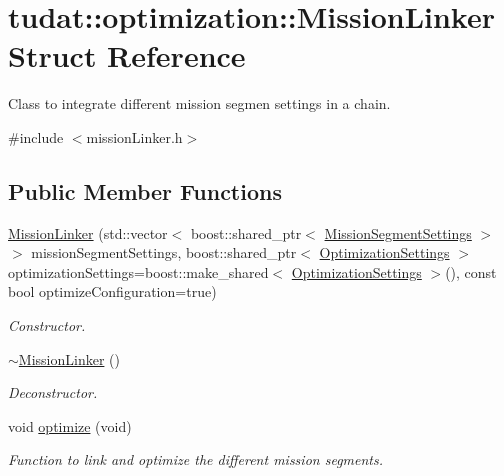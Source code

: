 \hypertarget{structtudat_1_1optimization_1_1MissionLinker}{}\section{tudat\+:\+:optimization\+:\+:Mission\+Linker Struct Reference}
\label{structtudat_1_1optimization_1_1MissionLinker}


Class to integrate different mission segmen settings in a chain.  




{\ttfamily \#include $<$mission\+Linker.\+h$>$}

\subsection*{Public Member Functions}
\begin{DoxyCompactItemize}
\item 
\hyperlink{structtudat_1_1optimization_1_1MissionLinker_ab0d734e238a59e107ee41adc22c22bf0}{Mission\+Linker} (std\+::vector$<$ boost\+::shared\+\_\+ptr$<$ \hyperlink{structtudat_1_1optimization_1_1MissionSegmentSettings}{Mission\+Segment\+Settings} $>$ $>$ mission\+Segment\+Settings, boost\+::shared\+\_\+ptr$<$ \hyperlink{structtudat_1_1optimization_1_1OptimizationSettings}{Optimization\+Settings} $>$ optimization\+Settings=boost\+::make\+\_\+shared$<$ \hyperlink{structtudat_1_1optimization_1_1OptimizationSettings}{Optimization\+Settings} $>$(), const bool optimize\+Configuration=true)
\begin{DoxyCompactList}\small\item\em Constructor. \end{DoxyCompactList}\item 
\hyperlink{structtudat_1_1optimization_1_1MissionLinker_a438c8ba91d56002d8cb218033f6ae382}{$\sim$\+Mission\+Linker} ()\hypertarget{structtudat_1_1optimization_1_1MissionLinker_a438c8ba91d56002d8cb218033f6ae382}{}\label{structtudat_1_1optimization_1_1MissionLinker_a438c8ba91d56002d8cb218033f6ae382}

\begin{DoxyCompactList}\small\item\em Deconstructor. \end{DoxyCompactList}\item 
void \hyperlink{structtudat_1_1optimization_1_1MissionLinker_a3c202f90f33f1cf63240ff91ba892159}{optimize} (void)
\begin{DoxyCompactList}\small\item\em Function to link and optimize the different mission segments. \end{DoxyCompactList}\end{DoxyCompactItemize}

